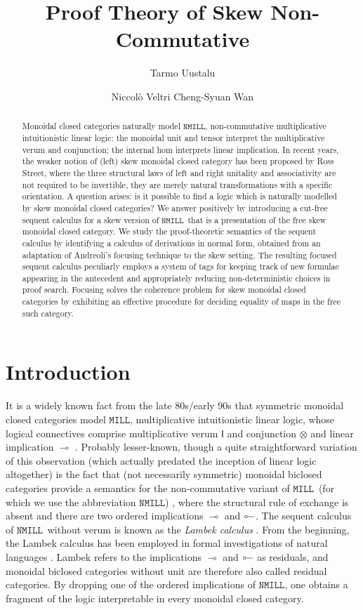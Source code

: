 \documentclass[copyright,creativecommons]{eptcs}
\title{Proof Theory of Skew Non-Commutative \MILL}
\author{Tarmo Uustalu
\institute{Reykjavik University, Iceland}
\institute{Tallinn University of Technology, Estonia}
\email{tarmo@ru.is}
\and
Niccol{\`o} Veltri \qquad\qquad Cheng-Syuan Wan
\institute{Tallinn University of Technology, Estonia}
\email{\quad niccolo@cs.ioc.ee \quad\qquad cswan@cs.ioc.ee}
}
\theoremstyle{definition}
\newcommand{\ot}{\otimes}
\newcommand{\lolli}{\multimap}
\newcommand{\illol}{\rotatebox[origin=c]{180}{$\multimap$}}
\newcommand{\I}{\mathsf{I}}
\newcommand{\MILL}{$\mathtt{MILL}$}
\newcommand{\NMILL}{$\mathtt{NMILL}$}
\begin{document}
\maketitle
\begin{abstract}
  Monoidal closed categories naturally model \NMILL, non-commutative multiplicative intuitionistic linear logic: the monoidal unit and tensor interpret the multiplicative verum and conjunction; the internal hom interprets linear implication. In recent years, the weaker notion of (left) skew monoidal closed category has been proposed by Ross Street, where the three structural laws of left and right unitality and associativity are not required to be invertible, they are merely natural transformations with a specific orientation. A question arises: is it possible to find a logic which is naturally modelled by skew monoidal closed categories? We answer positively by introducing a cut-free sequent calculus for a skew version of \NMILL\ that is a presentation of the free skew monoidal closed category. We study the proof-theoretic semantics of the sequent calculus by identifying a calculus of derivations in normal form, obtained from an adaptation of Andreoli's focusing technique to the skew setting. The resulting focused sequent calculus peculiarly employs a system of tags for keeping track of new formulae appearing in the antecedent and appropriately reducing non-deterministic choices in proof search. Focusing solves the coherence problem for skew monoidal closed categories by exhibiting an effective procedure for deciding equality of maps in the free such category.
\end{abstract}


\section{Introduction}

It is a widely known fact from the late 80s/early 90s that symmetric monoidal closed categories model \MILL, multiplicative intuitionistic linear logic, whose logical connectives comprise multiplicative verum $\I$ and conjunction $\ot$ and linear implication $\lolli$ \cite{mellies:categorical:09}. Probably lesser-known, though a quite straightforward variation of this observation (which actually predated the inception of linear logic altogether) is the fact that (not necessarily symmetric) monoidal biclosed categories provide a semantics for the non-commutative variant of \MILL\ (for which we use the abbreviation \NMILL) \cite{abrusci:noncommutative:1990}, where the structural rule of exchange is absent and there are two ordered implications $\lolli$ and $\illol$. The sequent calculus of \NMILL\ without verum is known as the \emph{Lambek calculus} \cite{lambek:deductive:68}. From the beginning, the Lambek calculus has been employed in formal investigations of natural languages \cite{lambek:mathematics:58}. Lambek refers to the implications $\lolli$ and $\illol$ as residuals, and monoidal biclosed categories without unit are therefore also called residual categories.
By dropping one of the ordered implications of \NMILL, one obtains a fragment of the logic interpretable in every monoidal closed category.
\end{document}
